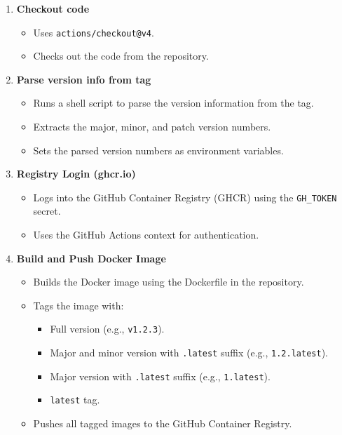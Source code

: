 \begin{enumerate}
    \item \textbf{Checkout code}
    \begin{itemize}
        \item Uses \texttt{actions/checkout@v4}.
        \item Checks out the code from the repository.
    \end{itemize}
    \item \textbf{Parse version info from tag}
    \begin{itemize}
        \item Runs a shell script to parse the version information from the tag.
        \item Extracts the major, minor, and patch version numbers.
        \item Sets the parsed version numbers as environment variables.
    \end{itemize}
    \item \textbf{Registry Login (ghcr.io)}
    \begin{itemize}
        \item Logs into the GitHub Container Registry (GHCR) using the \texttt{GH\_TOKEN} secret.
        \item Uses the GitHub Actions context for authentication.
    \end{itemize}
    \item \textbf{Build and Push Docker Image}
    \begin{itemize}
        \item Builds the Docker image using the Dockerfile in the repository.
        \item Tags the image with:
        \begin{itemize}
            \item Full version (e.g., \texttt{v1.2.3}).
            \item Major and minor version with \texttt{.latest} suffix (e.g., \texttt{1.2.latest}).
            \item Major version with \texttt{.latest} suffix (e.g., \texttt{1.latest}).
            \item \texttt{latest} tag.
        \end{itemize}
        \item Pushes all tagged images to the GitHub Container Registry.
    \end{itemize}
\end{enumerate}

